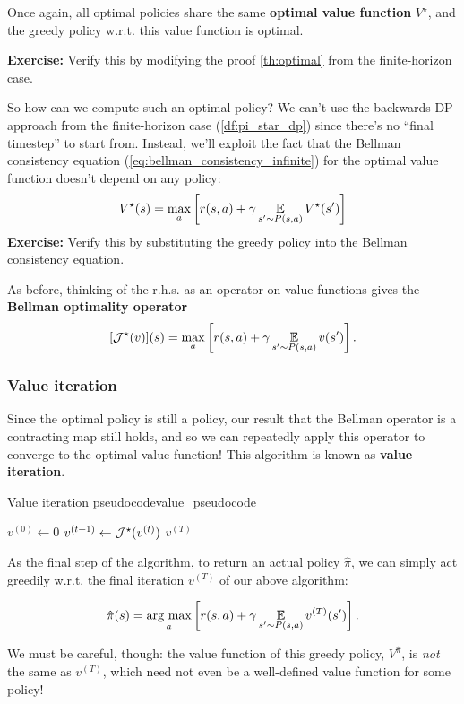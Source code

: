 \documentclass[../main/main]{subfiles}
\begin{document}
Once again, all optimal policies share the same \textbf{optimal value function} $V^\star$, and the greedy policy w.r.t. this value function is optimal.

\textbf{Exercise:} Verify this by modifying the proof \ref{th:optimal} from the finite-horizon case.

So how can we compute such an optimal policy? We can't use the backwards DP approach from the finite-horizon case (\ref{df:pi_star_dp}) since there's no ``final timestep'' to start from. Instead, we'll exploit the fact that the Bellman consistency equation (\ref{eq:bellman_consistency_infinite}) for the optimal value function doesn't depend on any policy:
\[
    V^\star(s) = \max_a \left[ r(s, a) + \gamma \operatorname*{\mathbb{E}}_{s' \sim P(s, a)} V^\star(s') \right]
\]
\textbf{Exercise:} Verify this by substituting the greedy policy into the Bellman consistency equation.

As before, thinking of the r.h.s. as an operator on value functions gives the \textbf{Bellman optimality operator}
\[
    [\mathcal{J}^{\star}(v)](s) = \max_a \left[ r(s, a) + \gamma \operatorname*{\mathbb{E}}_{s' \sim P(s, a)} v(s') \right].
\]

\subsubsection{Value iteration}

Since the optimal policy is still a policy, our result that the Bellman operator is a contracting map still holds, and so we can repeatedly apply this operator to converge to the optimal value function! This algorithm is known as \textbf{value iteration}.

\begin{definition}{Value iteration pseudocode}{value_pseudocode}
    \begin{algorithmic}
        \State $v^{(0)} \gets 0$
            \State $v^{(t+1)} \gets \mathcal{J}^{\star}(v^{(t)})$
        \EndFor
        \State \Return $v^{(T)}$
    \end{algorithmic}
\end{definition}


As the final step of the algorithm, to return an actual policy $\hat \pi$, we can simply act greedily w.r.t. the final iteration $v^{(T)}$ of our above algorithm:

\[
    \hat \pi(s) = \operatorname*{\textrm{arg\ max}}_a \left[ r(s, a) + \gamma \operatorname*{\mathbb{E}}_{s' \sim P(s, a)} v^{(T)}(s') \right].
\]

We must be careful, though: the value function of this greedy policy, $V^{\hat \pi}$, is \emph{not} the same as $v^{(T)}$, which need not even be a well-defined value function for some policy!
\end{document}
